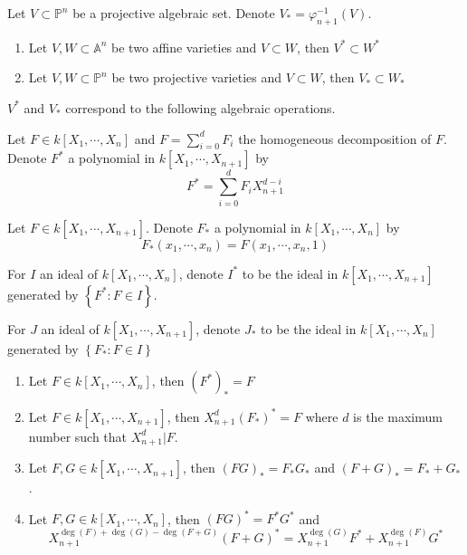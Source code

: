 \documentclass{note-eng}
\begin{document}
\begin{notation}
    Let $V \subset \mathbb{P}^n$ be a projective algebraic set. Denote $V_{\ast} = \varphi_{n + 1} ^{-1}(V)$.
\end{notation}

\begin{proposition} \label{prop:closure-preserve-order}
    \begin{enumerate}
        \item Let $V, W \subset \mathbb{A}^n$ be two affine varieties and $V \subset W$, then $V^\ast \subset W^\ast$
        \item Let $V, W \subset \mathbb{P}^n$ be two projective varieties and $V \subset W$, then $V_\ast \subset W_\ast$
    \end{enumerate}
\end{proposition}

$V^\ast$ and $V_\ast$ correspond to the following algebraic operations.

\begin{notation}
    Let $F \in k[X_1, \cdots, X_n]$ and $F = \sum\limits_{i = 0}^{d} F_i$ the homogeneous decomposition of $F$. Denote $F^\ast$ a polynomial in $k[X_1, \cdots, X_{n + 1}]$ by
    $$F^\ast = \sum\limits_{i = 0}^{d} F_i X_{n + 1}^{d - i}$$

    Let $F \in k[X_1, \cdots, X_{n + 1}]$. Denote $F_\ast$ a polynomial in $k[X_1, \cdots, X_n]$ by
    $$F_\ast(x_1, \cdots, x_n) = F(x_1, \cdots, x_n, 1)$$

    For $I$ an ideal of $k[X_1, \cdots, X_n]$, denote $I^\ast$ to be the ideal in $k[X_1, \cdots, X_{n + 1}]$ generated by $\left\lbrace F^\ast: F \in I \right\rbrace$.
    
    For $J$ an ideal of $k[X_1, \cdots, X_{n + 1}]$, denote $J_\ast$ to be the ideal in $k[X_1, \cdots, X_n]$ generated by $\left\lbrace F_\ast: F \in I \right\rbrace$
\end{notation}

\begin{proposition}\label{prop:rule-homogenize}
    \begin{enumerate}
        \item Let $F \in k[X_1, \cdots, X_n]$, then $(F^{\ast})_\ast = F$
        \item Let $F \in k[X_1, \cdots, X_{n + 1}]$, then $X_{n + 1}^d(F_{\ast})^\ast = F$ where $d$ is the maximum number such that $X_{n + 1}^d | F$.
        \item Let $F, G \in k[X_1, \cdots, X_{n + 1}]$, then $(FG)_\ast = F_\ast G_\ast$ and $(F + G)_\ast = F_\ast + G_\ast$.
        \item Let $F, G \in k[X_1, \cdots, X_n]$, then $(FG)^\ast = F^\ast G^\ast$ and
        $$X_{n + 1}^{\deg(F) + \deg(G) - \deg(F + G)} (F + G)^\ast = X_{n + 1}^{\deg(G)} F^\ast + X_{n + 1}^{\deg(F)} G^\ast$$
    \end{enumerate}
\end{proposition}
\end{document}
